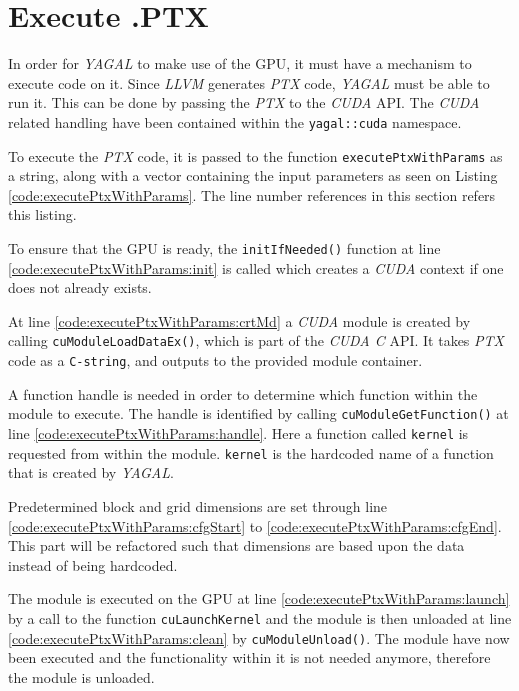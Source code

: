 \section{Execute .PTX} \label{cha:execPtx}

In order for \textit{YAGAL} to make use of the GPU, it must have a mechanism to execute code on it. Since \textit{LLVM} generates \textit{PTX} code, \textit{YAGAL} must be able to run it. This can be done by passing the \textit{PTX} to the \textit{CUDA} API. The \textit{CUDA} related handling have been contained within the \texttt{yagal::cuda} namespace. 

To execute the \textit{PTX} code, it is passed to the function \texttt{executePtxWithParams} as a string, along with a vector containing the input parameters as seen on Listing \ref{code:executePtxWithParams}. The line number references in this section refers this listing.

To ensure that the GPU is ready, the \texttt{initIfNeeded()} function at line \ref{code:executePtxWithParams:init} is called which creates a \textit{CUDA} context if one does not already exists.

At line \ref{code:executePtxWithParams:crtMd} a \textit{CUDA} module is created by calling \texttt{cuModuleLoadDataEx()}, which is part of the \textit{CUDA C} API. It takes \textit{PTX} code as a \texttt{C-string}, and outputs to the provided module container.

A function handle is needed in order to determine which function within the module to execute. The handle is identified by calling \texttt{cuModuleGetFunction()} at line \ref{code:executePtxWithParams:handle}. Here a function called \texttt{kernel} is requested from within the module. \texttt{kernel} is the hardcoded name of a function that is created by \textit{YAGAL}.

Predetermined block and grid dimensions are set through line \ref{code:executePtxWithParams:cfgStart} to \ref{code:executePtxWithParams:cfgEnd}. This part will be refactored such that dimensions are based upon the data instead of being hardcoded.

The module is executed on the GPU at line \ref{code:executePtxWithParams:launch} by a call to the function \texttt{cuLaunchKernel} and the module is then unloaded at line \ref{code:executePtxWithParams:clean} by \texttt{cuModuleUnload()}. The module have now been executed and the functionality within it is not needed anymore, therefore the module is unloaded.

